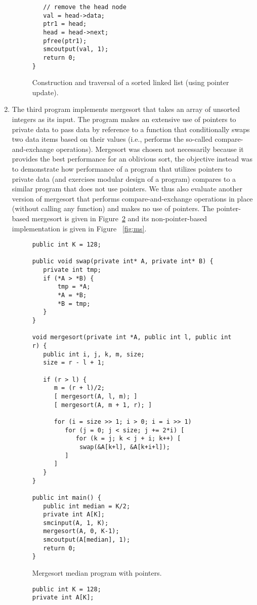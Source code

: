 \documentclass[11pt]{article}
\begin{document}
\begin{enumerate}
\begin{figure}[h!]
\begin{verbatim}
   // remove the head node
   val = head->data;
   ptr1 = head;
   head = head->next;
   pfree(ptr1);
   smcoutput(val, 1);
   return 0; 
}\end{verbatim}
\caption{Construction and traversal of a sorted linked list (using pointer
  update).} \label{fig:sl-di}
\end{figure}

\item The third program implements mergesort that takes an array of
  unsorted integers as its input. The program makes an extensive use of
  pointers to private data to pass data by reference to a function that
  conditionally swaps two data items based on their values (i.e., performs
  the so-called compare-and-exchange operations). Mergesort was chosen not 
  necessarily because it provides the best performance for an oblivious
  sort, the objective instead was to demonstrate how performance of a
  program that utilizes pointers to private data (and exercises modular
  design of a program) compares to a similar program that does not use
  pointers. We thus also evaluate another version of mergesort that performs
  compare-and-exchange operations in place (without calling any function)
  and makes no use of pointers. The pointer-based mergesort is given in
  Figure~\ref{fig:ms-p} and its non-pointer-based implementation is given in
  Figure ~\ref{fig:ms}. 
  
\begin{figure}[t!]\small
\begin{verbatim}
public int K = 128;

public void swap(private int* A, private int* B) {
   private int tmp;
   if (*A > *B) {
       tmp = *A;
       *A = *B;
       *B = tmp;
   }
}

void mergesort(private int *A, public int l, public int r) {
   public int i, j, k, m, size;
   size = r - l + 1;
   
   if (r > l) {
      m = (r + l)/2;
      [ mergesort(A, l, m); ]
      [ mergesort(A, m + 1, r); ]
      
      for (i = size >> 1; i > 0; i = i >> 1) 
         for (j = 0; j < size; j += 2*i) [
            for (k = j; k < j + i; k++) [
             swap(&A[k+l], &A[k+i+l]); 
         ]
      ]
   }
}

public int main() {
   public int median = K/2;
   private int A[K];
   smcinput(A, 1, K);
   mergesort(A, 0, K-1);
   smcoutput(A[median], 1);
   return 0;
}
\end{verbatim}
\caption{Mergesort median program with pointers.} \label{fig:ms-p}
\end{figure}
\begin{figure}[t!]\small
\begin{verbatim}
public int K = 128;
private int A[K];


\end{verbatim}
\end{figure}
\end{enumerate}
\end{document}

